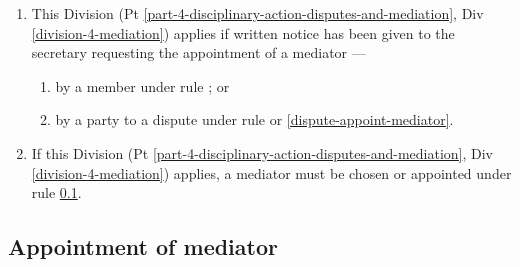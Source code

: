 \documentclass[../constitution.tex]{subfiles}
\begin{document}
\begin{enumerate}

\item This Division (Pt \ref{part-4-disciplinary-action-disputes-and-mediation}, Div \ref{division-4-mediation}) applies if written notice has been given to the secretary requesting the appointment of a mediator ---

  \begin{enumerate}
  
  \item by a member under rule ; or
  \item by a party to a dispute under rule  or \ref{dispute-appoint-mediator}.
  \end{enumerate}
\item If this Division (Pt \ref{part-4-disciplinary-action-disputes-and-mediation}, Div \ref{division-4-mediation}) applies, a mediator must be chosen or appointed under rule \ref{appointment-of-mediator}.
\end{enumerate}

\hypertarget{appointment-of-mediator-1}{%
\subsection{Appointment of mediator}\label{appointment-of-mediator}}
\end{document}
